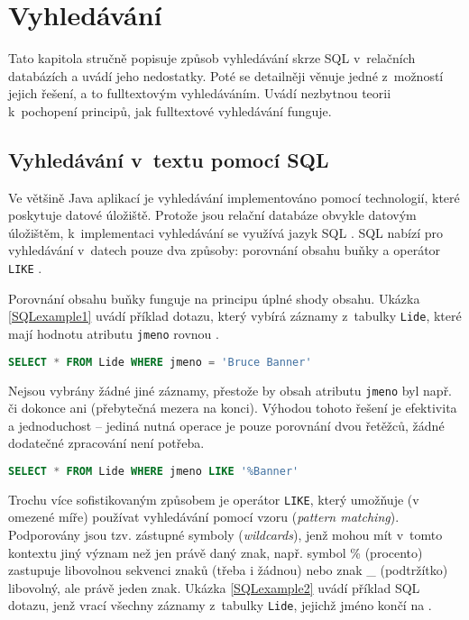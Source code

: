 \documentclass[11pt,oneside]{fithesis2}
\begin{document}
\chapter{Vyhledávání}
\label{VyhledavaniChapter}
Tato kapitola stručně popisuje způsob vyhledávání skrze SQL v~relačních databázích a uvádí jeho nedostatky. Poté se detailněji věnuje jedné z~možností jejich řešení, a to fulltextovým vyhledáváním. Uvádí nezbytnou teorii k~pochopení principů, jak fulltextové vyhledávání funguje.

\section{Vyhledávání v~textu pomocí SQL}
\label{SQLsection}
Ve většině Java aplikací je vyhledávání implementováno pomocí technologií, které poskytuje datové úložiště. Protože jsou relační databáze obvykle datovým úložištěm, k~implementaci vyhledávání se využívá jazyk SQL \cite{HibernateSearchAction}. SQL nabízí pro vyhledávání v~datech pouze dva způsoby: porovnání obsahu buňky a operátor \texttt{LIKE} \cite{MistrovstviMySQL}.

Porovnání obsahu buňky funguje na principu úplné shody obsahu. Ukázka \ref{SQLexample1} uvádí příklad dotazu, který vybírá záznamy z~tabulky \texttt{Lide}, které mají hodnotu atributu \texttt{jmeno} rovnou . 

\begin{lstlisting}[language=SQL, caption =  Jednoduché použití SQL pro vyhledávání pomocí úplné shody obsahu pole, label = SQLexample1]
SELECT * FROM Lide WHERE jmeno = 'Bruce Banner'
\end{lstlisting}

Nejsou vybrány žádné jiné záznamy, přestože by obsah atributu \texttt{jmeno} byl např.  či dokonce ani  (přebytečná mezera na konci). Výhodou tohoto řešení je efektivita a jednoduchost -- jediná nutná operace je 
pouze porovnání dvou řetěžců, žádné dodatečné zpracování není potřeba. 

\begin{lstlisting}[language=SQL, caption =  Použití SQL operátoru LIKE, label = SQLexample2]
SELECT * FROM Lide WHERE jmeno LIKE '%Banner'
\end{lstlisting}

Trochu více sofistikovaným způsobem je operátor \texttt{LIKE}, který umožňuje (v omezené míře) používat vyhledávání pomocí vzoru (\emph{pattern matching}). Podporovány jsou tzv. zástupné symboly (\emph{wildcards}), jenž mohou mít v~tomto kontextu jiný význam než jen právě daný znak, např. symbol \% (procento) zastupuje libovolnou sekvenci znaků (třeba i žádnou) nebo znak \_ (podtržítko) libovolný, ale právě jeden znak. Ukázka \ref{SQLexample2} uvádí příklad SQL dotazu, jenž vrací všechny záznamy z~tabulky \texttt{Lide}, jejichž jméno končí na .
\end{document}
